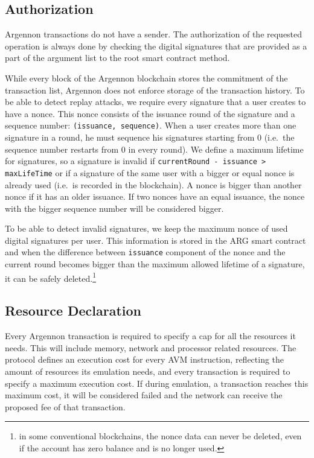 \subsection{Authorization}\label{subsec:txn-auth}

Argennon transactions do not have a sender. The authorization of the requested operation is always done by checking the
digital signatures that are provided as a part of the argument list to the root smart contract method.

While every block of the Argennon blockchain stores the commitment of the transaction list, Argennon does not enforce
storage of the transaction history. To be able to detect replay attacks, we require
every signature that a user creates to have a nonce. This nonce consists of the issuance round of the signature
and a sequence number: \texttt{(issuance,\ sequence)}. When a user creates more than one signature in a round, he
must sequence his signatures starting from 0 (i.e.~the sequence number restarts from 0 in every round). We define
a maximum lifetime for signatures, so a signature is invalid if \texttt{currentRound - issuance > maxLifeTime} or
if a signature of the same user with a bigger or equal nonce is already used
(i.e.~is recorded in the blockchain). A nonce is bigger than another nonce if it has an older issuance. If two
nonces have an equal issuance, the nonce with the bigger sequence number will be considered bigger.

To be able to detect invalid signatures, we keep the maximum nonce of used digital signatures per user. This information
is stored in the ARG smart contract and when the difference between \texttt{issuance} component of the nonce and
the current round becomes bigger than the maximum allowed lifetime of a signature, it can be safely
deleted.\footnote{in some conventional
blockchains, the nonce data can never be deleted, even if the account has zero balance and is no longer used.}

\subsection{Resource Declaration}\label{subsec:resource-declaration}

Every Argennon transaction is required to specify a cap for all the resources it needs. This
will include memory, network and processor related resources. The protocol defines an execution cost for
every AVM instruction, reflecting the amount of resources its emulation needs, and every transaction is required
to specify a maximum execution cost. If during emulation, a transaction reaches this maximum cost, it will be
considered failed and the network can receive the proposed fee of that transaction.

